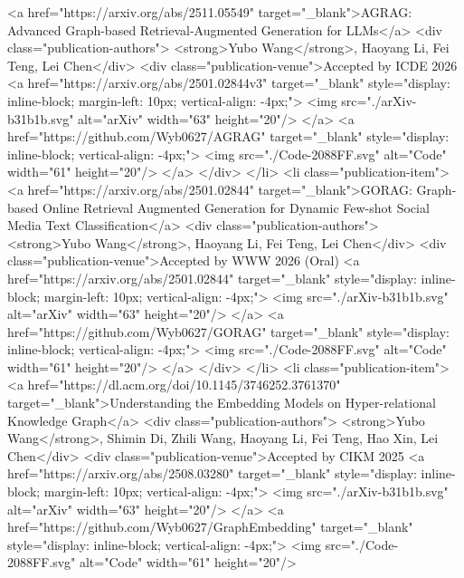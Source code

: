             <a href="https://arxiv.org/abs/2511.05549" target="_blank">AGRAG: Advanced Graph-based Retrieval-Augmented Generation for LLMs</a>
            <div class="publication-authors"> <strong>Yubo Wang</strong>, Haoyang Li, Fei Teng, Lei Chen</div>
            <div class="publication-venue">Accepted by ICDE 2026
                <a href="https://arxiv.org/abs/2501.02844v3" target="_blank" style="display: inline-block; margin-left: 10px; vertical-align: -4px;">
                    <img src="./arXiv-b31b1b.svg" alt="arXiv" width="63" height="20"/>
                </a>
                <a href="https://github.com/Wyb0627/AGRAG" target="_blank" style="display: inline-block; vertical-align: -4px;">
                    <img src="./Code-2088FF.svg" alt="Code" width="61" height="20"/>
                </a>
           </div>
        </li>
        <li class="publication-item">
            <a href="https://arxiv.org/abs/2501.02844" target="_blank">GORAG: Graph-based Online Retrieval Augmented Generation for Dynamic Few-shot Social Media Text Classification</a>
            <div class="publication-authors"> <strong>Yubo Wang</strong>, Haoyang Li, Fei Teng, Lei Chen</div>
            <div class="publication-venue">Accepted by WWW 2026 (Oral)
                <a href="https://arxiv.org/abs/2501.02844" target="_blank" style="display: inline-block; margin-left: 10px; vertical-align: -4px;">
                    <img src="./arXiv-b31b1b.svg" alt="arXiv" width="63" height="20"/>
                </a>
                <a href="https://github.com/Wyb0627/GORAG" target="_blank" style="display: inline-block; vertical-align: -4px;">
                    <img src="./Code-2088FF.svg" alt="Code" width="61" height="20"/>
                </a>
           </div>
        </li>
        <li class="publication-item">
            <a href="https://dl.acm.org/doi/10.1145/3746252.3761370" target="_blank">Understanding the Embedding Models on Hyper-relational Knowledge Graph</a>
            <div class="publication-authors"> <strong>Yubo Wang</strong>, Shimin Di, Zhili Wang, Haoyang Li, Fei Teng, Hao Xin, Lei Chen</div>
            <div class="publication-venue">Accepted by CIKM 2025
                <a href="https://arxiv.org/abs/2508.03280" target="_blank" style="display: inline-block; margin-left: 10px; vertical-align: -4px;">
                    <img src="./arXiv-b31b1b.svg" alt="arXiv" width="63" height="20"/>
                </a>
                <a href="https://github.com/Wyb0627/GraphEmbedding" target="_blank" style="display: inline-block; vertical-align: -4px;">
                    <img src="./Code-2088FF.svg" alt="Code" width="61" height="20"/>
